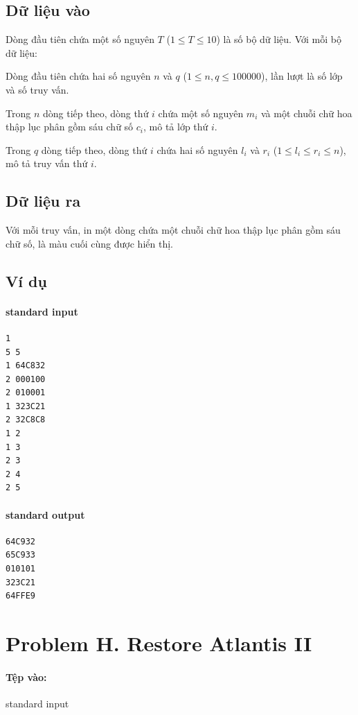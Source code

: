 \documentclass[11pt]{article}
\begin{document}
\subsection*{Dữ liệu vào}

Dòng đầu tiên chứa một số nguyên \(T\) (\(1\le T\le 10\)) là số bộ dữ liệu.
Với mỗi bộ dữ liệu:

Dòng đầu tiên chứa hai số nguyên \(n\) và \(q\)
(\(1\le n,q\le 100000\)), lần lượt là số lớp và số truy vấn.

Trong \(n\) dòng tiếp theo, dòng thứ \(i\) chứa một số nguyên \(m_i\) và một
chuỗi chữ hoa thập lục phân gồm sáu chữ số \(c_i\), mô tả lớp thứ \(i\).

Trong \(q\) dòng tiếp theo, dòng thứ \(i\) chứa hai số nguyên \(l_i\) và
\(r_i\) (\(1\le l_i\le r_i\le n\)), mô tả truy vấn thứ \(i\).

\subsection*{Dữ liệu ra}

Với mỗi truy vấn, in một dòng chứa một chuỗi chữ hoa thập lục phân gồm sáu
chữ số, là màu cuối cùng được hiển thị.

\subsection*{Ví dụ}

\paragraph{standard input}
\begin{verbatim}
1
5 5
1 64C832
2 000100
2 010001
1 323C21
2 32C8C8
1 2
1 3
2 3
2 4
2 5
\end{verbatim}

\paragraph{standard output}
\begin{verbatim}
64C932
65C933
010101
323C21
64FFE9
\end{verbatim}

\section{Problem H. Restore Atlantis II}

\paragraph{Tệp vào:} standard input
\end{document}
